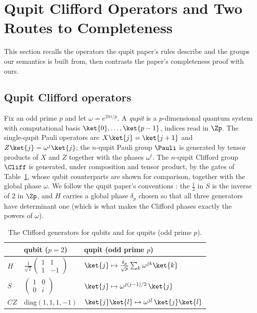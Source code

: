 \section{Qupit Clifford Operators and Two Routes to Completeness}\label{sec:two-routes}

This section recalls the operators the qupit paper's rules describe and
the groups our semantics is built from, then contrasts the paper's
completeness proof with ours.

\subsection{Qupit Clifford operators}\label{sec:operators}

Fix an odd prime $p$ and let $\omega = e^{2\pi i/p}$.  A \emph{qupit} is
a $p$-dimensional quantum system with computational basis
$\ket{0},\dots,\ket{p-1}$, indices read in $\Zp$.  The single-qupit Pauli
operators are $X\ket{j} = \ket{j+1}$ and $Z\ket{j} = \omega^{j}\ket{j}$;
the $n$-qupit Pauli group $\Pauli$ is generated by tensor products of $X$
and $Z$ together with the phases $\omega^t$.  The $n$-qupit Clifford
group $\Cliff$ is generated, under composition and tensor product, by the
gates of Table~\ref{tab:gates}, whose qubit counterparts are shown for
comparison, together with the global phase $\omega$.  We follow the qupit paper's conventions
\cite{bian2026qudit}: the $\tfrac12$ in $S$ is the inverse of $2$ in
$\Zp$, and $H$ carries a global phase $\delta_p$ chosen so that all three
generators have determinant one (which is what makes the Clifford phases
exactly the powers of $\omega$).

\begin{table}[h]
\caption{The Clifford generators for qubits and for qupits (odd prime $p$).}
\label{tab:gates}
\centering
\begin{tabular}{lll}
\toprule
 & qubit ($p = 2$) & qupit (odd prime $p$) \\
\midrule
$H$  & $\frac{1}{\sqrt2}\begin{pmatrix}1&1\\1&-1\end{pmatrix}$
     & $\ket{j} \mapsto \tfrac{\delta_p}{\sqrt p}\sum_k \omega^{jk}\ket{k}$ \\[2ex]
$S$  & $\begin{pmatrix}1&0\\0&i\end{pmatrix}$
     & $\ket{j} \mapsto \omega^{j(j-1)/2}\,\ket{j}$ \\[2ex]
$CZ$ & $\mathrm{diag}(1,1,1,-1)$
     & $\ket{j}\ket{l} \mapsto \omega^{jl}\,\ket{j}\ket{l}$ \\
\bottomrule
\end{tabular}
\end{table}

